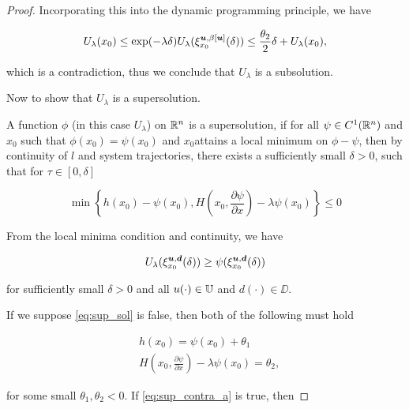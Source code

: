 \begin{for_journal}
\begin{proof}
Incorporating this into the dynamic programming principle, we have

\begin{equation}
U_{\lambda}(x_0) \leq \exp(-\lambda \delta)U_{\lambda}(\xi_{x_0}^{\bm{u},\beta[\bm{u}]}(\delta)) \leq \frac{\theta_2}{2} \delta + U_{\lambda}(x_0),
\end{equation}

\noindent which is a contradiction, thus we conclude that $U_{\lambda}$ is a subsolution.


Now to show that $U_{\lambda}$ is a supersolution. 

\begin{definition} A function $\phi$ (in this case $U_{\lambda}$) on $\mathbb{R}^n$  is a supersolution, if for all $\psi \in C^1(\mathbb{R}^n)$ and $x_0$ such that $\phi(x_0) = \psi(x_0)$ and $x_0$attains a local minimum on $\phi- \psi$, then by continuity of $l$ and system trajectories, there exists a sufficiently small $\delta>0$, such that for $\tau \in [0, \delta]$

\begin{equation}\label{eq:sup_sol}
    \min\left\{h(x_0)-\psi(x_0), H(x_0,\frac{\partial \psi}{\partial x}) - \lambda \psi(x_0)\right\} \leq 0
\end{equation} 
\end{definition}

From the local minima condition and continuity, we have

\begin{equation*}
U_{\lambda}(\xi_{x_0}^{\bm{u}, \bm{d}}(\delta)) \geq \psi(\xi_{x_0}^{\bm{u}, \bm{d}}(\delta))
\end{equation*}

\noindent for sufficiently small $\delta>0$ and all $u(\cdot) \in \mathbb{U}$ and $d(\cdot) \in \DD$.

If we suppose \eqref{eq:sup_sol} is false, then both of the following must hold 

\begin{subequations}
\begin{align}
&h(x_0) = \psi(x_0) + \theta_1 \label{eq:sup_contra_a}\\
&H(x_0,\frac{\partial \psi}{\partial x}) - \lambda \psi(x_0) = \theta_2 \label{eq:sup_contra_b},
\end{align} 
\end{subequations}

for some small $\theta_1, \theta_2 < 0$. If \eqref{eq:sup_contra_a} is true, then 


\end{proof}
\end{for_journal}
